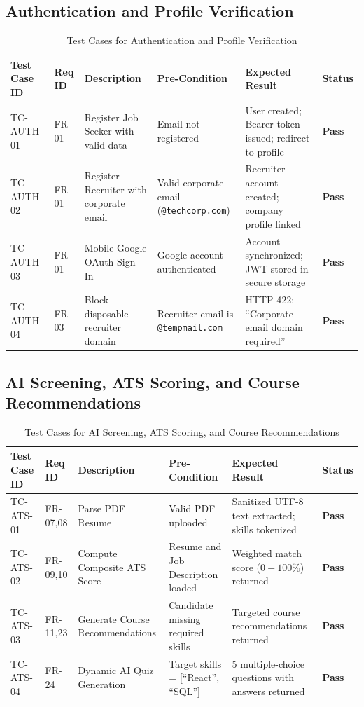 \subsection{Authentication and Profile Verification}
\begin{table}[h!]
\centering
\small
\caption{Test Cases for Authentication and Profile Verification}
\label{tab:tc_auth}
\begin{tabular}{|p{2.2cm}|p{1.4cm}|p{3.4cm}|p{2.8cm}|p{3.2cm}|p{1cm}|}
\hline
\textbf{Test Case ID} & \textbf{Req ID} & \textbf{Description} & \textbf{Pre-Condition} & \textbf{Expected Result} & \textbf{Status} \\ \hline
TC-AUTH-01 & FR-01 & Register Job Seeker with valid data & Email not registered & User created; Bearer token issued; redirect to profile & \textbf{Pass} \\ \hline
TC-AUTH-02 & FR-01 & Register Recruiter with corporate email & Valid corporate email (\texttt{@techcorp.com}) & Recruiter account created; company profile linked & \textbf{Pass} \\ \hline
TC-AUTH-03 & FR-01 & Mobile Google OAuth Sign-In & Google account authenticated & Account synchronized; JWT stored in secure storage & \textbf{Pass} \\ \hline
TC-AUTH-04 & FR-03 & Block disposable recruiter domain & Recruiter email is \texttt{@tempmail.com} & HTTP 422: ``Corporate email domain required'' & \textbf{Pass} \\ \hline
\end{tabular}
\end{table}

\subsection{AI Screening, ATS Scoring, and Course Recommendations}
\begin{table}[h!]
\centering
\small
\caption{Test Cases for AI Screening, ATS Scoring, and Course Recommendations}
\label{tab:tc_ai_screening}
\begin{tabular}{|p{2.2cm}|p{1.4cm}|p{3.4cm}|p{2.8cm}|p{3.2cm}|p{1cm}|}
\hline
\textbf{Test Case ID} & \textbf{Req ID} & \textbf{Description} & \textbf{Pre-Condition} & \textbf{Expected Result} & \textbf{Status} \\ \hline
TC-ATS-01 & FR-07,08 & Parse PDF Resume & Valid PDF uploaded & Sanitized UTF-8 text extracted; skills tokenized & \textbf{Pass} \\ \hline
TC-ATS-02 & FR-09,10 & Compute Composite ATS Score & Resume and Job Description loaded & Weighted match score ($0-100\%$) returned & \textbf{Pass} \\ \hline
TC-ATS-03 & FR-11,23 & Generate Course Recommendations & Candidate missing required skills & Targeted course recommendations returned & \textbf{Pass} \\ \hline
TC-ATS-04 & FR-24 & Dynamic AI Quiz Generation & Target skills = [``React'', ``SQL''] & 5 multiple-choice questions with answers returned & \textbf{Pass} \\ \hline
\end{tabular}
\end{table}

